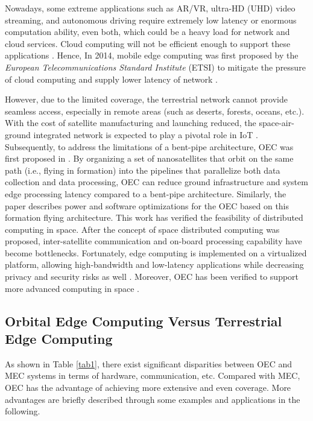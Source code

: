 \documentclass[lettersize,journal]{IEEEtran}
\begin{document}
Nowadays, some extreme applications such as AR/VR, ultra-HD (UHD) video streaming, and autonomous driving require extremely low latency or enormous computation ability, even both, which could be a heavy load for network and cloud services. Cloud computing will not be efficient enough to support these applications \cite{RN150}. Hence, In 2014, mobile edge computing was first proposed by the \emph{European Telecommunications Standard Institute} (ETSI) to mitigate the pressure of cloud computing and supply lower latency of network \cite{RN155}. 

However, due to the limited coverage, the terrestrial network cannot provide seamless access, especially in remote areas (such as deserts, forests, oceans, etc.). With the cost of satellite manufacturing and launching reduced, the space-air-ground integrated network is expected to play a pivotal role in IoT \cite{RN88}. Subsequently, to address the limitations of a bent-pipe architecture, OEC was first proposed in \cite{RN187}. By organizing a set of nanosatellites that orbit on the same path (i.e., flying in formation) into the pipelines that parallelize both data collection and data processing, OEC can reduce ground infrastructure and system edge processing latency compared to a bent-pipe architecture. Similarly, the paper \cite{RN57} describes power and software optimizations for the OEC based on this formation flying architecture. This work has verified the feasibility of distributed computing in space. After the concept of space distributed computing was proposed, inter-satellite communication and on-board processing capability have become bottlenecks. Fortunately, edge computing is implemented on a virtualized platform, allowing high-bandwidth and low-latency applications while decreasing privacy and security risks as well \cite{RN157,RN158}. Moreover, OEC has been verified to support more advanced computing in space \cite{RN187}.


\subsection{Orbital Edge Computing Versus Terrestrial Edge Computing}
As shown in Table \ref{tab1}, there exist significant disparities between OEC and MEC systems in terms of hardware, communication, etc. Compared with MEC, OEC has the advantage of achieving more extensive and even coverage. More advantages are briefly described through some examples and applications in the following.
\end{document}
